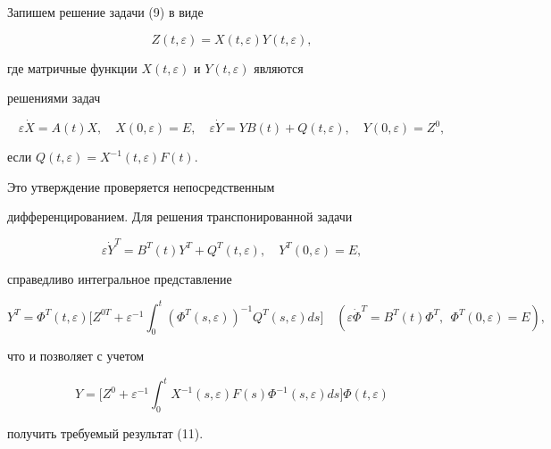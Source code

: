  


 


\begin{pf} 


Запишем решение задачи (9) в виде 


$$ 


Z(t,\varepsilon)=X(t,\varepsilon)Y(t,\varepsilon), 


$$ 


где матричные функции $X(t,\varepsilon)$ и $Y(t,\varepsilon)$ являются 


решениями задач 


$$ 


\varepsilon\Dot X=A(t)X,\quad X(0,\varepsilon)=E,\quad 


\varepsilon\Dot Y=YB(t)+Q(t,\varepsilon),\quad Y(0,\varepsilon)=Z^0, 


$$ 


если $Q(t,\varepsilon)=X^{-1}(t,\varepsilon)F(t)$.


Это утверждение проверяется непосредственным 


дифференцированием. Для решения транспонированной задачи 


$$ 


\varepsilon\Dot Y^T=B^T(t)Y^T+Q^T(t,\varepsilon),\quad 


Y^T(0,\varepsilon)=E, 


$$ 


справедливо интегральное представление 


$$ 


Y^T=\Phi^T(t,\varepsilon)\bigg[Z^{0T}+\varepsilon^{-1} 


\int^t_0(\Phi^T(s,\varepsilon))^{-1}Q^T(s,\varepsilon)ds\bigg]\quad 


(\varepsilon\Dot\Phi^T=B^T(t)\Phi^T,\ \ 


\Phi^T(0,\varepsilon)=E), 


$$ 


что и позволяет с учетом 


$$ 


Y=\bigg[Z^0+\varepsilon^{-1}\int^t_0 X^{-1}(s,\varepsilon) 


F(s)\Phi^{-1}(s,\varepsilon)ds\bigg]\Phi(t,\varepsilon) 


$$ 


получить требуемый результат (11). 


\end{pf} 


 


